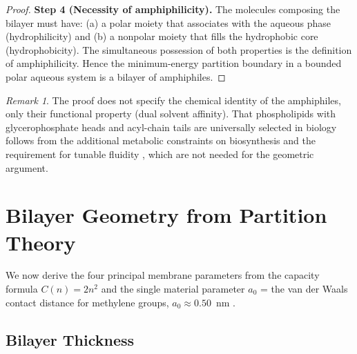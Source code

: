 \documentclass[11pt,twocolumn,a4paper]{article}
\theoremstyle{definition}
\theoremstyle{remark}
\newtheorem{remark}[theorem]{Remark}
\begin{document}
\begin{proof}
\textbf{Step 4 (Necessity of amphiphilicity).}
The molecules composing the bilayer must have: (a) a polar moiety that
associates with the aqueous phase (hydrophilicity) and (b) a nonpolar moiety
that fills the hydrophobic core (hydrophobicity). The simultaneous possession
of both properties is the definition of amphiphilicity. Hence the
minimum-energy partition boundary in a bounded polar aqueous system is
a bilayer of amphiphiles.
\end{proof}

\begin{remark}
The proof does not specify the chemical identity of the amphiphiles, only their
functional property (dual solvent affinity). That phospholipids with
glycerophosphate heads and acyl-chain tails are universally selected in biology
follows from the additional metabolic constraints on biosynthesis and the
requirement for tunable fluidity \citep{mouritsen2005}, which are not needed
for the geometric argument.
\end{remark}

\section{Bilayer Geometry from Partition Theory}
\label{sec:geometry}

We now derive the four principal membrane parameters from the capacity formula
$C(n) = 2n^2$ and the single material parameter $a_0$ = the van der Waals
contact distance for methylene groups, $a_0 \approx 0.50$~nm
\citep{israelachvili1991}.

\subsection{Bilayer Thickness}
\label{subsec:thickness}
\end{document}
